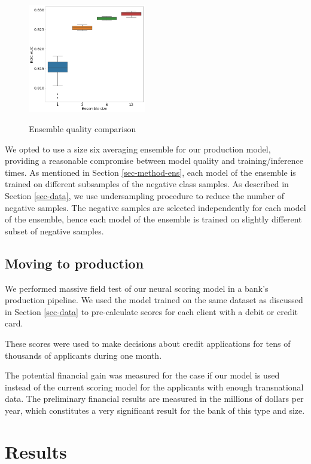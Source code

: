 \documentclass[sigconf]{acmart}
\begin{document}
\begin{figure}[ht]
  \caption{Ensemble quality comparison}
  \includegraphics[width=0.46\textwidth]{figures/ensemble-pic.png}
  \label{fig-ens}
\end{figure}

We opted to use a size six averaging ensemble for our production model, providing a reasonable compromise between model quality and training/inference times. As mentioned in Section \ref{sec-method-ens}, each model of the ensemble is trained on different subsamples of the negative class samples. As described in Section \ref{sec-data}, we use undersampling procedure to reduce the number of negative samples. The negative samples are selected independently for each model of the ensemble, hence each model of the ensemble is trained on slightly different subset of negative samples.

\subsection{Moving to production}

We performed massive field test of our neural scoring model in a bank's production pipeline. We used the model trained on the same dataset as discussed in Section \ref{sec-data} to pre-calculate scores for each client with a debit or credit card.

These scores were used to make decisions about credit applications for tens of thousands of applicants during one month.

The potential financial gain was measured for the case if our model is used instead of the current scoring model for the applicants with enough transnational data. The preliminary financial results are measured in the millions of dollars per year, which constitutes a very significant result for the bank of this type and size.

\section{Results}
\end{document}
